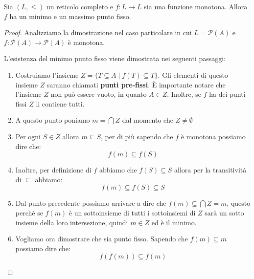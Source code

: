 \begin{teorema}
    Sia $(L,\leq)$ un reticolo completo e $f: L \to L$ sia una funzione monotona.
    Allora $f$ ha un minimo e un massimo punto fisso.
    \begin{proof}
        Analizziamo la dimostrazione nel caso particolare in cui $L = \mathcal{P}(A)$
        e $f: \mathcal{P}(A) \to \mathcal{P}(A)$ è monotona.

        L'esistenza del minimo punto fisso viene dimostrata nei seguenti passaggi:
        \begin{enumerate}
            \item Costruiamo l'insieme $Z = \{T \subseteq A \mid f(T) \subseteq
                      T\}$. Gli elementi di questo insieme $Z$ saranno chiamati
                  \textbf{punti pre-fissi}. È importante notare che l'insieme $Z$
                  non può essere vuoto, in quanto $A \in Z$. Inoltre, se $f$ ha
                  dei punti fissi $Z$ li contiene tutti.
            \item A questo punto poniamo $m = \bigcap Z$ dal momento che $Z \neq
                      \emptyset$
            \item Per ogni $S \in Z$ allora $m \subseteq S$, per di più sapendo
                  che $f$ è monotona possiamo dire che:
                  \begin{equation}
                      f(m) \subseteq f(S)
                  \end{equation}
            \item Inoltre, per definizione di $f$ abbiamo che $f(S) \subseteq S$
                  allora per la transitività di $\subseteq$ abbiamo:
                  \begin{equation}
                      f(m) \subseteq f(S) \subseteq S
                  \end{equation}
            \item Dal punto precedente possiamo arrivare a dire che $f(m) \subseteq
                      \bigcap Z = m$, questo perché se $f(m)$ è un sottoinsieme di
                  tutti i sottoinsiemi di $Z$ sarà un sotto insieme della loro
                  intersezione, quindi $m \in Z$ ed è il minimo.
            \item Vogliamo ora dimostrare che sia punto fisso. Sapendo che
                  $f(m) \subseteq m$ possiamo dire che:
                  \begin{equation}
                      f(f(m)) \subseteq f(m)
                  \end{equation}

\end{enumerate}
\end{proof}
\end{teorema}
